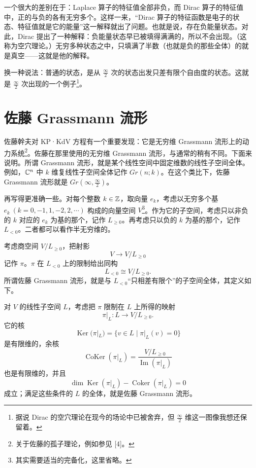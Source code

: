 一个很大的差别在于：Laplace 算子的特征值全部非负，而 Dirac 算子的特征值中，正的与负的各有无穷多个。这样一来，“Dirac 算子的特征函数是电子的状态、特征值就是它的能量”这一解释就出了问题。也就是说，存在负能量状态。对此，Dirac 提出了一种解释：负能量状态早已被填得满满的，所以不会出现。（这称为空穴理论。）无穷多种状态之中，只填满了半数（也就是负的那些全体）的就是真空——这就是他的解释。

换一种说法：普通的状态，是从 $\frac{\infty}{2}$ 次的状态出发只差有限个自由度的状态。这就是 $\frac{\infty}{2}$ 次出现的一个例子\footnote{据说 Dirac 的空穴理论在现今的场论中已被舍弃，但 $\frac{\infty}{2}$ 维这一图像我想还保留着。}。

\section{佐藤 Grassmann 流形}

佐藤幹夫对 KP·KdV 方程有一个重要发现：它是无穷维 Grassmann 流形上的动力系统\footnote{关于佐藤的孤子理论，例如参见 [4]。}。佐藤在那里使用的无穷维 Grassmann 流形，与通常的稍有不同。下面来说明。所谓 Grassmann 流形，就是某个线性空间中固定维数的线性子空间全体。例如，$\mathbb{C}^n$ 中 $k$ 维复线性子空间全体记作 $Gr(n;k)$。在这个类比下，佐藤 Grassmann 流形就是 $Gr(\infty,\frac{\infty}{2})$。

再写得更准确一些。对每个整数 $k\in\mathbb{Z}$，取向量 $e_k$，考虑以无穷多个基 $e_k\ (k=0,-1,1,-2,2,\cdots)$ 构成的向量空间 $V$\footnote{其实需要适当的完备化，这里省略。}。作为它的子空间，考虑只以非负的 $k$ 对应的 $e_k$ 为基的那个，记作 $L_{\ge 0}$。再考虑只以负的 $k$ 为基的那个，记作 $L_{<0}$。二者都可以看作半无穷维的。

考虑商空间 $V/L_{\ge 0}$，把射影
\[ V \longrightarrow V/L_{\ge 0} \]
记作 $\pi$。$\pi$ 在 $L_{<0}$ 上的限制给出同构
\[ L_{<0}\cong V/L_{\ge 0}. \]
所谓佐藤 Grassmann 流形，就是与 $L_{<0}$“只相差有限个”的子空间全体，其定义如下。

对 $V$ 的线性子空间 $L$，考虑把 $\pi$ 限制在 $L$ 上所得的映射
\[ \pi|_L : L \longrightarrow V/L_{\ge 0}. \]
它的核
\[ \operatorname{Ker}(\pi|_L)=\{v\in L\mid \pi|_L(v)=0\} \]
是有限维的，余核
\[ \operatorname{CoKer}(\pi|_L)=\frac{V/L_{\ge 0}}{\operatorname{Im}(\pi|_L)} \]
也是有限维的，并且
\[ \dim\operatorname{Ker}(\pi|_L)-\operatorname{Coker}(\pi|_L)=0 \]
成立；满足这些条件的 $L$ 的全体，就是佐藤 Grassmann 流形。

